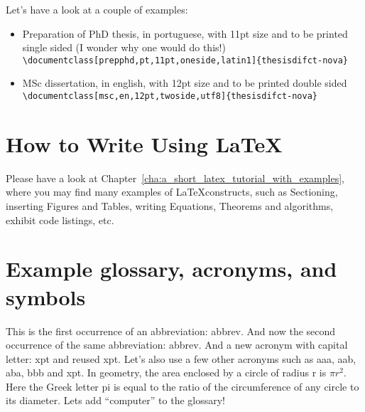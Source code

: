 Let's have a look at a couple of examples:

\begin{itemize}
	\item Preparation of PhD thesis, in portuguese, with 11pt size and to be printed single sided (I wonder why one would do this!)\\
	\verb!\documentclass[prepphd,pt,11pt,oneside,latin1]{thesisdifct-nova}!
	\item MSc dissertation, in english, with 12pt size and to be printed double sided\\
	\verb!\documentclass[msc,en,12pt,twoside,utf8]{thesisdifct-nova}!
\end{itemize}

\section{How to Write Using \LaTeX} %
\label{sec:how_to_write_using_latex}

Please have a look at Chapter~\ref{cha:a_short_latex_tutorial_with_examples}, where you may find many examples of \LaTeX constructs, such as Sectioning, inserting Figures and Tables, writing Equations, Theorems and algorithms, exhibit code listings, etc.




\section{Example glossary, acronyms, and symbols}
%
%
This is the first occurrence of an abbreviation: \gls{abbrev}. And now the second occurrence of the same abbreviation: \gls{abbrev}. And a new acronym with capital letter: \Gls{xpt} and reused \gls{xpt}.  Let's also use a few other acronyms such as \gls{aaa}, \gls{aab}, \gls{aba}, \gls{bbb} and \gls{xpt}.
In geometry, the area enclosed by a circle of radius \gls{r} is $\pi r^2$. Here the Greek letter \gls{pi} is equal to the ratio of the circumference of any circle to its diameter.
Lets add ``\gls{computer}'' to the glossary!
%
